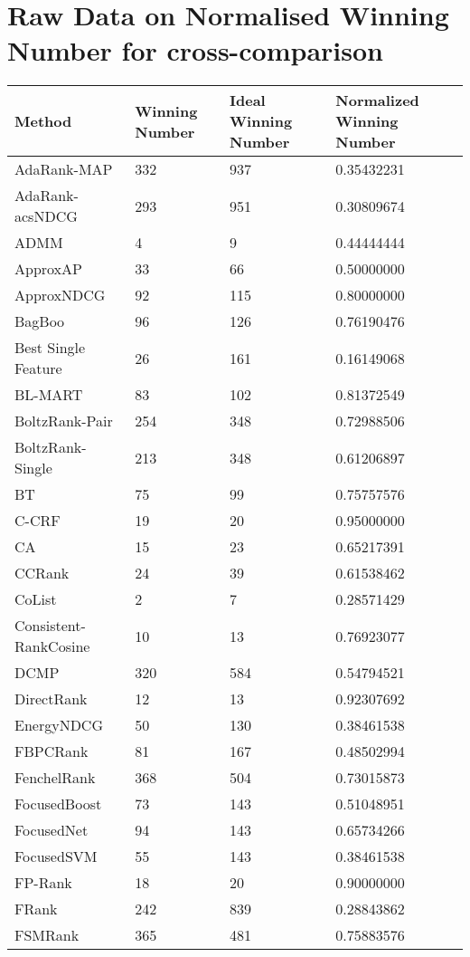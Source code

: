 \chapter{Raw Data on Normalised Winning Number for cross-comparison}
\label{app:norm_winnum_all}

\begin{longtable}{l|l|l|l}
Method & Winning Number & Ideal Winning Number & Normalized Winning Number \\
\hline
AdaRank-\acs{MAP} & 332 & 937 & 0.35432231 \\ 
AdaRank-acs{NDCG} & 293 & 951 & 0.30809674 \\ 
ADMM & 4 & 9 & 0.44444444 \\ 
Approx\acs{AP} & 33 & 66 & 0.50000000 \\ 
Approx\acs{NDCG} & 92 & 115 & 0.80000000 \\ 
BagBoo & 96 & 126 & 0.76190476 \\ 
Best Single Feature & 26 & 161 & 0.16149068 \\ 
BL-MART & 83 & 102 & 0.81372549 \\ 
BoltzRank-Pair & 254 & 348 & 0.72988506 \\ 
BoltzRank-Single & 213 & 348 & 0.61206897 \\ 
BT & 75 & 99 & 0.75757576 \\ 
C-CRF & 19 & 20 & 0.95000000 \\ 
CA & 15 & 23 & 0.65217391 \\ 
CCRank & 24 & 39 & 0.61538462 \\ 
CoList & 2 & 7 & 0.28571429 \\ 
Consistent-RankCosine & 10 & 13 & 0.76923077 \\ 
DCMP & 320 & 584 & 0.54794521 \\ 
DirectRank & 12 & 13 & 0.92307692 \\ 
Energy\acs{NDCG} & 50 & 130 & 0.38461538 \\ 
FBPCRank & 81 & 167 & 0.48502994 \\ 
FenchelRank & 368 & 504 & 0.73015873 \\ 
FocusedBoost & 73 & 143 & 0.51048951 \\ 
FocusedNet & 94 & 143 & 0.65734266 \\ 
Focused\acs{SVM} & 55 & 143 & 0.38461538 \\ 
FP-Rank & 18 & 20 & 0.90000000 \\ 
FRank & 242 & 839 & 0.28843862 \\ 
FSMRank & 365 & 481 & 0.75883576 \\ 

\end{longtable}
